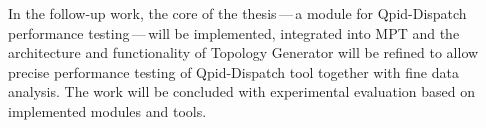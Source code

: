 In the follow-up work, the core of the thesis\,---\,a module for Qpid-Dispatch performance testing\,---\,will be implemented, integrated into MPT and the architecture and functionality of Topology Generator will be refined to allow precise performance testing of Qpid-Dispatch tool together with fine data analysis. The work will be concluded with experimental evaluation based on implemented modules and tools.



